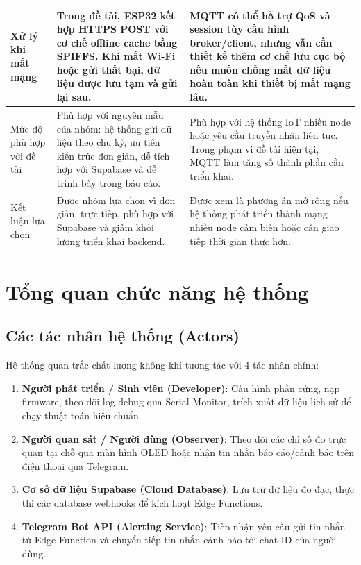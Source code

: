 \begin{table}[H]
\begin{tabularx}{\textwidth}{|p{3.3cm}|X|X|}
Xử lý khi mất mạng 
& Trong đề tài, ESP32 kết hợp HTTPS POST với cơ chế offline cache bằng SPIFFS. Khi mất Wi-Fi hoặc gửi thất bại, dữ liệu được lưu tạm và gửi lại sau. 
& MQTT có thể hỗ trợ QoS và session tùy cấu hình broker/client, nhưng vẫn cần thiết kế thêm cơ chế lưu cục bộ nếu muốn chống mất dữ liệu hoàn toàn khi thiết bị mất mạng lâu. \\
\hline

Mức độ phù hợp với đề tài 
& Phù hợp với nguyên mẫu của nhóm: hệ thống gửi dữ liệu theo chu kỳ, ưu tiên kiến trúc đơn giản, dễ tích hợp với Supabase và dễ trình bày trong báo cáo. 
& Phù hợp với hệ thống IoT nhiều node hoặc yêu cầu truyền nhận liên tục. Trong phạm vi đề tài hiện tại, MQTT làm tăng số thành phần cần triển khai. \\
\hline

Kết luận lựa chọn 
& Được nhóm lựa chọn vì đơn giản, trực tiếp, phù hợp với Supabase và giảm khối lượng triển khai backend. 
& Được xem là phương án mở rộng nếu hệ thống phát triển thành mạng nhiều node cảm biến hoặc cần giao tiếp thời gian thực hơn. \\
\hline

\end{tabularx}
\end{table}

\section{Tổng quan chức năng hệ thống}
\subsection{Các tác nhân hệ thống (Actors)}
Hệ thống quan trắc chất lượng không khí tương tác với 4 tác nhân chính:
\begin{enumerate}
    \item \textbf{Người phát triển / Sinh viên (Developer)}: Cấu hình phần cứng, nạp firmware, theo dõi log debug qua Serial Monitor, trích xuất dữ liệu lịch sử để chạy thuật toán hiệu chuẩn.
    \item \textbf{Người quan sát / Người dùng (Observer)}: Theo dõi các chỉ số đo trực quan tại chỗ qua màn hình OLED hoặc nhận tin nhắn báo cáo/cảnh báo trên điện thoại qua Telegram.
    \item \textbf{Cơ sở dữ liệu Supabase (Cloud Database)}: Lưu trữ dữ liệu đo đạc, thực thi các database webhooks để kích hoạt Edge Functions.
    \item \textbf{Telegram Bot API (Alerting Service)}: Tiếp nhận yêu cầu gửi tin nhắn từ Edge Function và chuyển tiếp tin nhắn cảnh báo tới chat ID của người dùng.
\end{enumerate}

